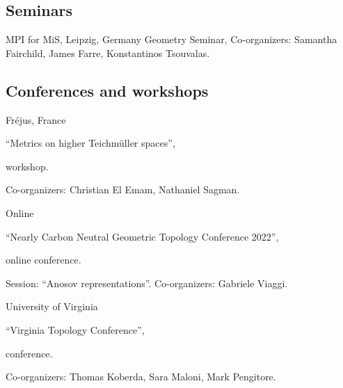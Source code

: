
\subsection{Seminars}

{MPI for MiS, Leipzig, Germany}
{Geometry Seminar,}
{Co-organizers: Samantha Fairchild, James Farre, Konstantinos Tsouvalas.}

\subsection{Conferences and workshops}

{Fr\'ejus, France}
{``Metrics on higher Teichm\"uller spaces'', \begin{footnotesize}
		workshop.
\end{footnotesize}}
{Co-organizers: Christian El Emam, Nathaniel Sagman.}

{Online}
{``Nearly Carbon Neutral Geometric Topology Conference 2022'', \begin{footnotesize}
		online conference.
\end{footnotesize}}
{Session: ``Anosov representations''. Co-organizers: Gabriele Viaggi.}

{University of Virginia}
{``Virginia Topology Conference'', \begin{footnotesize}
		conference.
\end{footnotesize}}
{Co-organizers: Thomas Koberda, Sara Maloni, Mark Pengitore.}
%